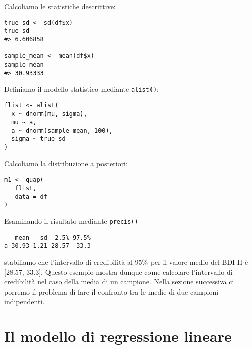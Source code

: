 \noindent
Calcoliamo le statistiche descrittive:



\begin{lstlisting}
true_sd <- sd(df$x)
true_sd
#> 6.606858

sample_mean <- mean(df$x)
sample_mean
#> 30.93333
\end{lstlisting}
 


\noindent
Definiamo il modello statistico mediante \verb+alist()+:




\begin{lstlisting}
flist <- alist(
  x ~ dnorm(mu, sigma), 
  mu ~ a,
  a ~ dnorm(sample_mean, 100),
  sigma ~ true_sd
)
\end{lstlisting}
 


\noindent
Calcoliamo la distribuzione a posteriori:


\begin{lstlisting}
m1 <- quap( 
   flist,
   data = df 
)
\end{lstlisting}
 


\noindent
Esaminando il risultato mediante \verb+precis()+




\begin{lstlisting}
   mean   sd  2.5% 97.5%
a 30.93 1.21 28.57  33.3
\end{lstlisting}
 


\noindent
stabiliamo che l'intervallo di credibilità al 95\% per il valore medio del BDI-II è [28.57, 33.3].
Questo esempio mostra dunque come calcolare l'intervallo di credibilità nel caso della media di un campione.
Nella sezione successiva ci porremo il problema di fare il confronto tra le medie di due campioni indipendenti. 


\section{Il modello di regressione lineare}
\label{sec_mod_lin}

